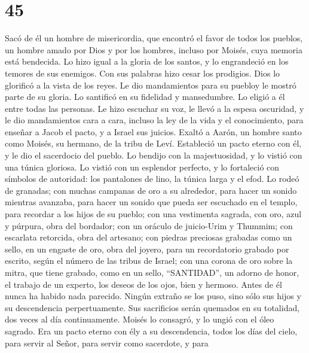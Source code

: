 \hypertarget{section-44}{%
\section{45}\label{section-44}}

 Sacó de él un hombre de misericordia, que encontró el
favor de todos los pueblos, un hombre amado por Dios y por los hombres,
incluso por Moisés, cuya memoria está bendecida.  Lo hizo
igual a la gloria de los santos, y lo engrandeció en los temores de sus
enemigos.  Con sus palabras hizo cesar los prodigios. Dios
lo glorificó a la vista de los reyes. Le dio mandamientos para su
puebloy le mostró parte de su gloria.  Lo santificó en su
fidelidad y mansedumbre. Lo eligió a él entre todas las personas.
 Le hizo escuchar su voz, le llevó a la espesa oscuridad,
y le dio mandamientos cara a cara, incluso la ley de la vida y el
conocimiento, para enseñar a Jacob el pacto, y a Israel sus juicios.
 Exaltó a Aarón, un hombre santo como Moisés, su hermano,
de la tribu de Leví.  Estableció un pacto eterno con él, y
le dio el sacerdocio del pueblo. Lo bendijo con la majestuosidad, y lo
vistió con una túnica gloriosa.  Lo vistió con un
esplendor perfecto, y lo fortaleció con símbolos de autoridad: los
pantalones de lino, la túnica larga y el efod.  Lo rodeó
de granadas; con muchas campanas de oro a su alrededor, para hacer un
sonido mientras avanzaba, para hacer un sonido que pueda ser escuchado
en el templo, para recordar a los hijos de su pueblo; 
con una vestimenta sagrada, con oro, azul y púrpura, obra del bordador;
con un oráculo de juicio-Urim y Thummim;  con escarlata
retorcida, obra del artesano; con piedras preciosas grabadas como un
sello, en un engaste de oro, obra del joyero, para un recordatorio
grabado por escrito, según el número de las tribus de Israel;
 con una corona de oro sobre la mitra, que tiene grabado,
como en un sello, ``SANTIDAD'', un adorno de honor, el trabajo de un
experto, los deseos de los ojos, bien y hermoso.  Antes
de él nunca ha habido nada parecido. Ningún extraño se los puso, sino
sólo sus hijos y su descendencia perpertuamente.  Sus
sacrificios serán quemados en su totalidad, dos veces al día
continuamente.  Moisés lo consagró, y lo ungió con el
óleo sagrado. Era un pacto eterno con ély a su descendencia, todos los
días del cielo, para servir al Señor, para servir como sacerdote, y para
